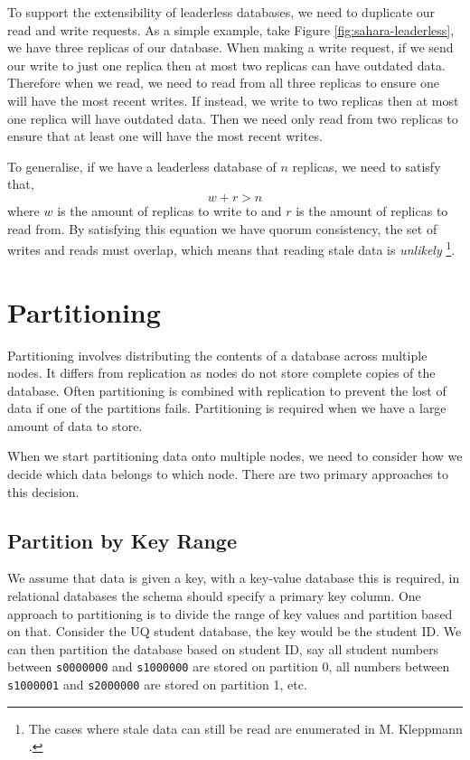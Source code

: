To support the extensibility of leaderless databases,
we need to duplicate our read and write requests.
As a simple example, take Figure \ref{fig:sahara-leaderless}, we have three replicas of our database.
When making a write request,
if we send our write to just one replica then at most two replicas can have outdated data.
Therefore when we read, we need to read from all three replicas to ensure one will have the most recent writes.
If instead, we write to two replicas then at most one replica will have outdated data.
Then we need only read from two replicas to ensure that at least one will have the most recent writes.

To generalise, if we have a leaderless database of $n$ replicas, we need to satisfy that,
\vspace{-0.25em}
$$
w + r > n
$$
\vspace{-0.35em}
where $w$ is the amount of replicas to write to and $r$ is the amount of replicas to read from.
By satisfying this equation we have quorum consistency, the set of writes and reads must overlap,
which means that reading stale data is \textit{unlikely}%
\footnote{The cases where stale data can still be read are enumerated in M. Kleppmann \cite{data-intensive}.}.


\section{Partitioning}

Partitioning involves distributing the contents of a database across multiple nodes.
It differs from replication as nodes do not store complete copies of the database.
Often partitioning is combined with replication to prevent the lost of data if one of the partitions fails.
Partitioning is required when we have a large amount of data to store.

When we start partitioning data onto multiple nodes,
we need to consider how we decide which data belongs to which node.
There are two primary approaches to this decision.

\subsection*{Partition by Key Range}
We assume that data is given a key,
with a key-value database this is required,
in relational databases the schema should specify a primary key column.
One approach to partitioning is to divide the range of key values and partition based on that.
Consider the UQ student database,
the key would be the student ID.
We can then partition the database based on student ID,
say all student numbers between \texttt{s0000000} and \texttt{s1000000} are stored on partition 0,
all numbers between \texttt{s1000001} and \texttt{s2000000} are stored on partition 1, etc.

